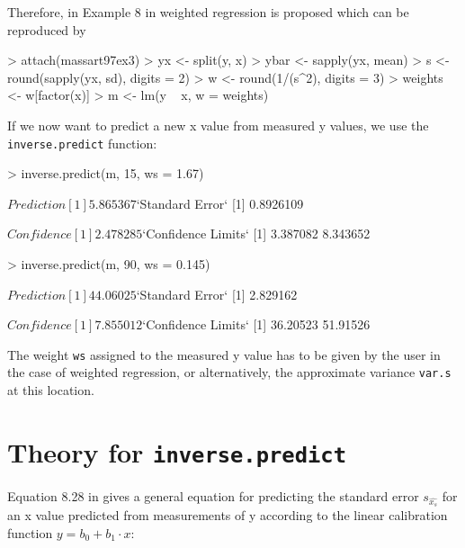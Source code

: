 \documentclass[a4paper]{article}
\begin{document}
Therefore, in Example 8 in \cite{massart97} weighted regression
is proposed which can be reproduced by

\begin{Schunk}
\begin{Sinput}
> attach(massart97ex3)
> yx <- split(y, x)
> ybar <- sapply(yx, mean)
> s <- round(sapply(yx, sd), digits = 2)
> w <- round(1/(s^2), digits = 3)
> weights <- w[factor(x)]
> m <- lm(y ~ x, w = weights)
\end{Sinput}
\end{Schunk}

If we now want to predict a new x value from measured y values,
we use the \texttt{inverse.predict} function:

\begin{Schunk}
\begin{Sinput}
> inverse.predict(m, 15, ws = 1.67)
\end{Sinput}
\begin{Soutput}
$Prediction
[1] 5.865367

$`Standard Error`
[1] 0.8926109

$Confidence
[1] 2.478285

$`Confidence Limits`
[1] 3.387082 8.343652
\end{Soutput}
\begin{Sinput}
> inverse.predict(m, 90, ws = 0.145)
\end{Sinput}
\begin{Soutput}
$Prediction
[1] 44.06025

$`Standard Error`
[1] 2.829162

$Confidence
[1] 7.855012

$`Confidence Limits`
[1] 36.20523 51.91526
\end{Soutput}
\end{Schunk}

The weight \texttt{ws} assigned to the measured y value has to be 
given by the user in the case of weighted regression, or alternatively,
the approximate variance \texttt{var.s} at this location.

\section*{Theory for \texttt{inverse.predict}}
Equation 8.28 in \cite{massart97} gives a general equation for predicting the
standard error $s_{\hat{x_s}}$ for an x value predicted from measurements of y
according to the linear calibration function $ y = b_0 + b_1 \cdot x$:
\end{document}
